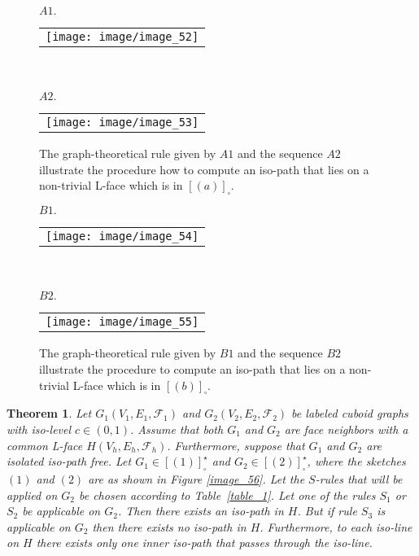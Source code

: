 \documentclass[a4paper,11pt]{article}
\newtheorem{theorem}{Theorem}[section]
\begin{document}
\FloatBarrier
\begin{figure}[!ht]
$A1.$
\begin{tabular}[c]{l}
\texttt{[image: image/image\_52]}
\end{tabular}\\ \\
$A2.$
\begin{tabular}[c]{l}
\texttt{[image: image/image\_53]}
\end{tabular}
\caption{The graph-theoretical rule given by $A1$ and the sequence $A2$ illustrate the procedure
how to compute an iso-path that lies on a non-trivial L-face which is in $[(a)]_{\square}$.}
\label{image_52_53}
\end{figure}
\FloatBarrier

\begin{figure}[!ht]
$B1.$
\begin{tabular}[c]{l}
\texttt{[image: image/image\_54]}
\end{tabular}
\\ \\
$B2.$
\begin{tabular}[c]{l}
\texttt{[image: image/image\_55]}
\end{tabular}
\caption{The graph-theoretical rule given by $B1$ and the sequence $B2$ illustrate the procedure
to compute an iso-path that lies on a non-trivial L-face which is in $[(b)]_{\square}$.}
\label{image_54_55}
\end{figure}
\FloatBarrier
\begin{theorem}\label{thm:class-5}
Let $G_1(V_1,E_1,\mathcal{F}_1)$ and $G_2(V_2,E_2,\mathcal{F}_2)$ be labeled cuboid
graphs with iso-level $c\in (0,1)$. Assume that both $G_1$ and $G_2$ are face neighbors
with a common L-face $H(V_h,E_h,\mathcal{F}_h)$. Furthermore, suppose that $G_1$ and $G_2$ are
isolated iso-path free. Let $G_1\in [(1)]_{\square}^{\star}$ and $G_2\in [(2)]_{\square}^{\star}$,
where the sketches $(1)$ and $(2)$ are as shown in Figure \ref{image_56}. Let the $S$-rules that will
be applied on $G_2$ be chosen according to Table~\ref{table_1}. Let one of the rules $S_1$ or $S_2$ be
applicable on $G_2$. Then there exists an iso-path in $H$. But if rule $S_3$ is applicable on $G_2$ then
there exists no iso-path in $H$. Furthermore, to each iso-line on $H$ there exists only one inner iso-path
that passes through the iso-line.
\end{theorem}
\end{document}
